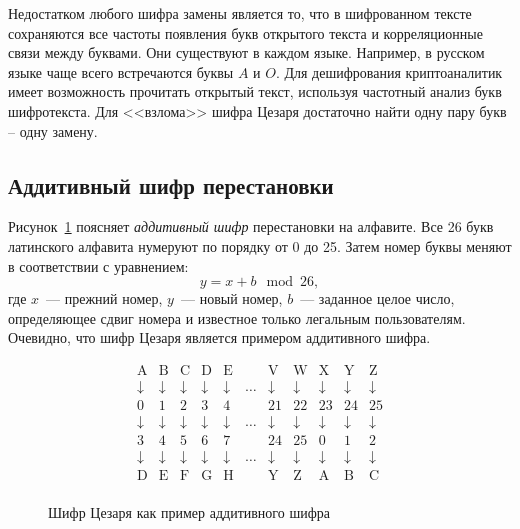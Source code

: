 Недостатком любого шифра замены является то, что в шифрованном тексте сохраняются все частоты появления букв открытого текста и корреляционные связи между буквами. Они существуют в каждом языке. Например, в русском языке чаще всего встречаются буквы $A$ и $O$. Для дешифрования криптоаналитик имеет возможность прочитать открытый текст, используя частотный анализ букв шифротекста. Для <<взлома>> шифра Цезаря достаточно найти одну пару букв -- одну замену.

\subsection{Аддитивный шифр перестановки}

Рисунок~\ref{fig:caesar-additiv} поясняет \emph{аддитивный шифр} перестановки на алфавите. Все 26 букв латинского алфавита нумеруют по порядку от 0 до 25. Затем номер буквы меняют в соответствии с уравнением:
    \[ y = x + b \mod 26, \]
где $x$~--- прежний номер, $y$~--- новый номер, $b$~--- заданное целое число, определяющее сдвиг номера и известное только легальным пользователям. Очевидно, что шифр Цезаря является примером аддитивного шифра.

\begin{figure}[thb]
\[ \begin{array}{ccccccccccc}
    \text{A} & \text{B} & \text{C} & \text{D} & \text{E} & & \text{V} & \text{W} & \text{X} & \text{Y} & \text{Z} \\
    \downarrow & \downarrow & \downarrow & \downarrow & \downarrow & \dots & \downarrow & \downarrow & \downarrow & \downarrow & \downarrow \\
    0 & 1 & 2 & 3 & 4 & & 21 & 22 & 23 & 24 & 25 \\
    \downarrow & \downarrow & \downarrow & \downarrow & \downarrow & \dots & \downarrow & \downarrow & \downarrow & \downarrow & \downarrow \\
    3 & 4 & 5 & 6 & 7 & & 24 & 25 & 0 & 1 & 2 \\
    \downarrow & \downarrow & \downarrow & \downarrow & \downarrow & \dots & \downarrow & \downarrow & \downarrow & \downarrow & \downarrow \\
    \text{D} & \text{E} & \text{F} & \text{G} & \text{H} & & \text{Y} & \text{Z} & \text{A} & \text{B} & \text{C} \\
\end{array} \]
	\caption{Шифр Цезаря как пример аддитивного шифра}
	\label{fig:caesar-additiv}
\end{figure}


